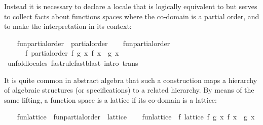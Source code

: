 \begin{isabellebody}
\begin{isamarkuptext}
  Instead it is necessary to declare a locale that is logically
  equivalent to  but serves to collect facts
  about functions spaces where the co-domain is a partial order, and
  to make the interpretation in its context:%
\end{isamarkuptext}%
\isamarkuptrue%
\ \ \isamarkupfalse%
\ fun{}partial{}order\ {}\ partial{}order\isanewline
\isanewline
\ \ \isamarkupfalse%
\ fun{}partial{}order\ {}\isanewline
\ \ \ \ \ \ f{}\ partial{}order\ {}{}f\ g{}\ {}x{}\ f\ x\ {}\ g\ x{}\isanewline
%
\isadelimproof
\ \ \ \ %
\endisadelimproof
%
\isatagproof
{}\isamarkupfalse%
\ unfold{}locales\ {}fast{}rule{}fast{}blast\ intro{}\ trans{}%
\endisatagproof
{\isafoldproof}%
%
\isadelimproof
%
\endisadelimproof
%
\begin{isamarkuptext}%
It is quite common in abstract algebra that such a construction
  maps a hierarchy of algebraic structures (or specifications) to a
  related hierarchy.  By means of the same lifting, a function space
  is a lattice if its co-domain is a lattice:%
\end{isamarkuptext}%
\isamarkuptrue%
\ \ \isamarkupfalse%
\ fun{}lattice\ {}\ fun{}partial{}order\ {}\ lattice\isanewline
\isanewline
\ \ \isamarkupfalse%
\ fun{}lattice\ {}\ f{}\ lattice\ {}{}f\ g{}\ {}x{}\ f\ x\ {}\ g\ x{}\isanewline

\end{isabellebody}
